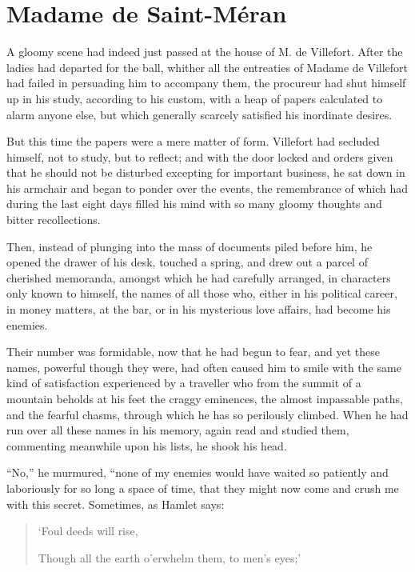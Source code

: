 \chapter{Madame de Saint-Méran}

A gloomy scene had indeed just passed at the house of M. de Villefort.
After the ladies had departed for the ball, whither all the entreaties
of Madame de Villefort had failed in persuading him to accompany them,
the procureur had shut himself up in his study, according to his
custom, with a heap of papers calculated to alarm anyone else, but
which generally scarcely satisfied his inordinate desires.

But this time the papers were a mere matter of form. Villefort had
secluded himself, not to study, but to reflect; and with the door
locked and orders given that he should not be disturbed excepting for
important business, he sat down in his armchair and began to ponder
over the events, the remembrance of which had during the last eight
days filled his mind with so many gloomy thoughts and bitter
recollections.

Then, instead of plunging into the mass of documents piled before him,
he opened the drawer of his desk, touched a spring, and drew out a
parcel of cherished memoranda, amongst which he had carefully arranged,
in characters only known to himself, the names of all those who, either
in his political career, in money matters, at the bar, or in his
mysterious love affairs, had become his enemies.

Their number was formidable, now that he had begun to fear, and yet
these names, powerful though they were, had often caused him to smile
with the same kind of satisfaction experienced by a traveller who from
the summit of a mountain beholds at his feet the craggy eminences, the
almost impassable paths, and the fearful chasms, through which he has
so perilously climbed. When he had run over all these names in his
memory, again read and studied them, commenting meanwhile upon his
lists, he shook his head.

“No,” he murmured, “none of my enemies would have waited so patiently
and laboriously for so long a space of time, that they might now come
and crush me with this secret. Sometimes, as Hamlet says:

\begin{quote}
{\small‘Foul deeds will rise,

Though all the earth o’erwhelm them, to men’s eyes;’}
\end{quote}

